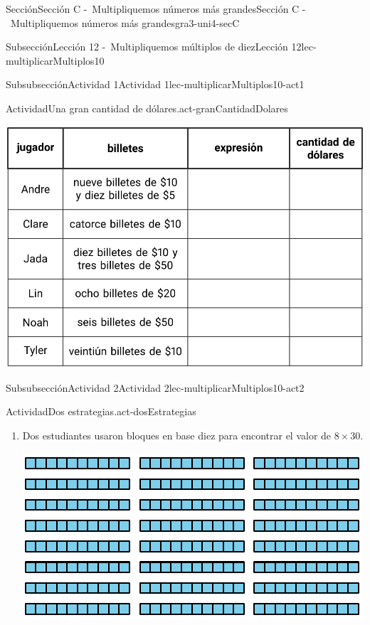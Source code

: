 \documentclass[twoside,10pt,]{article}
\begin{document}
\begin{sectionptx}{Sección}{Sección C -~Multipliquemos números más grandes}{}{Sección C -~Multipliquemos números más grandes}{}{}{gra3-uni4-secC}
\begin{subsectionptx}{Subsección}{Lección 12 -~Multipliquemos múltiplos de diez}{}{Lección 12}{}{}{lec-multiplicarMultiplos10}
\begin{subsubsectionptx}{Subsubsección}{Actividad 1}{}{Actividad 1}{}{}{lec-multiplicarMultiplos10-act1}
\begin{activity}{Actividad}{Una gran cantidad de dólares.}{act-granCantidadDolares}
\begin{enumerate}
\begin{image}{0}{1}{0}{}
\includegraphics[width=\linewidth]{external/tikz-source/unaGranCantidadDeDolares-tab2.pdf}
\end{image}%
\end{enumerate}
\end{activity}%
\end{subsubsectionptx}
%
%
\typeout{************************************************}
\typeout{************************************************}
%
\begin{subsubsectionptx}{Subsubsección}{Actividad 2}{}{Actividad 2}{}{}{lec-multiplicarMultiplos10-act2}
\begin{activity}{Actividad}{Dos estrategias.}{act-dosEstrategias}%
%
\begin{enumerate}
\item{}Dos estudiantes usaron bloques en base diez para encontrar el valor de \(8\times 30\).%
\begin{image}{0}{1}{0}{}%
\includegraphics[width=\linewidth]{external/svg-source/tikz-file-149356-scale13.pdf}
\end{image}%

\end{enumerate}
\end{activity}
\end{subsubsectionptx}
\end{subsectionptx}
\end{sectionptx}
\end{document}

